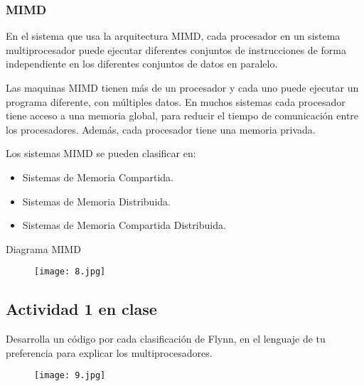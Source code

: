{\raggedright
\subsubsection{\textbf{MIMD}}
}

En el sistema que usa la arquitectura MIMD, cada procesador en un sistema multiprocesador puede ejecutar diferentes conjuntos de instrucciones de forma independiente en los diferentes conjuntos de datos en paralelo.

Las maquinas MIMD tienen más de un procesador y cada uno puede ejecutar un programa diferente, con múltiples datos. En muchos sistemas cada procesador tiene acceso a una memoria global, para reducir el tiempo de comunicación entre los procesadores. Además, cada procesador tiene una memoria privada.

\vspace{1cm}
\begin{center}
	{\raggedright
	Los sistemas MIMD se pueden clasificar en:
	}
\end{center}

\begin{itemize}
	\item Sistemas de Memoria Compartida.
	\item Sistemas de Memoria Distribuida.
	\item Sistemas de Memoria Compartida Distribuida.
\end{itemize}
\vspace{1cm}

\begin{center}
Diagrama MIMD
\end{center}

\begin{figure}[h!]
		\centering
		{\texttt{[image: 8.jpg]}\par} \vspace{1cm}
\end{figure}

{\raggedright
\subsection{Actividad 1 en clase}
}

{\raggedright
Desarrolla un código por cada clasificación de Flynn, en el lenguaje de tu preferencia para explicar los multiprocesadores.
}

\begin{figure}[h!]
		\centering
		{\texttt{[image: 9.jpg]}\par} \vspace{.5cm}
\end{figure}

